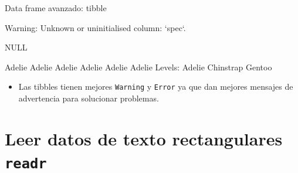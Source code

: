 \documentclass[
  ignorenonframetext,
  aspectratio=169]{beamer}
\newenvironment{Shaded}{\begin{snugshade}}{\end{snugshade}}
\newcommand{\FunctionTok}[1]{\textcolor[rgb]{0.13,0.29,0.53}{\textbf{#1}}}
\newcommand{\NormalTok}[1]{#1}
\newcommand{\SpecialCharTok}[1]{\textcolor[rgb]{0.81,0.36,0.00}{\textbf{#1}}}
\providecommand{\tightlist}{%
  \setlength{\itemsep}{0pt}\setlength{\parskip}{0pt}}
\let\oldverbatim\verbatim
\let\endoldverbatim\endverbatim
\renewenvironment{verbatim}{\tiny\oldverbatim}{\endoldverbatim}
\begin{document}
\begin{frame}[fragile]{Data frame avanzado: tibble}
\label{data-frame-avanzado-tibble-10}
\begin{Shaded}
\end{Shaded}

\begin{verbatim}
Warning: Unknown or uninitialised column: `spec`.
\end{verbatim}

\begin{verbatim}
NULL
\end{verbatim}

\begin{Shaded}
\end{Shaded}

\begin{verbatim}
[1] Adelie Adelie Adelie Adelie Adelie Adelie
Levels: Adelie Chinstrap Gentoo
\end{verbatim}

\begin{itemize}
\tightlist
\item
  Las tibbles tienen mejores \texttt{Warning} y \texttt{Error} ya que
  dan mejores mensajes de advertencia para solucionar problemas.
\end{itemize}
\end{frame}

\section{\texorpdfstring{Leer datos de texto rectangulares
\texttt{readr}}{Leer datos de texto rectangulares readr}}\label{leer-datos-de-texto-rectangulares-readr}
\end{document}
